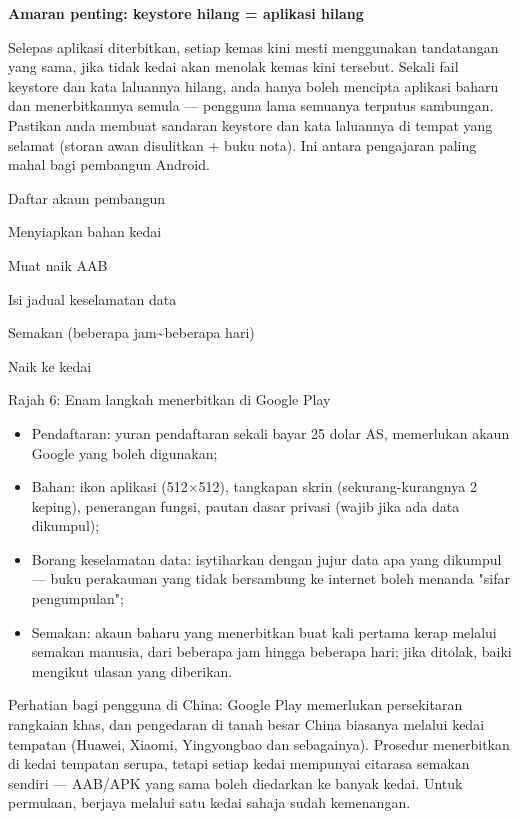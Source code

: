 \textbf{Amaran penting: keystore hilang = aplikasi hilang}\par

Selepas aplikasi diterbitkan, setiap kemas kini mesti menggunakan tandatangan yang sama, jika tidak kedai akan menolak kemas kini tersebut. Sekali fail keystore dan kata laluannya hilang, anda hanya boleh mencipta aplikasi baharu dan menerbitkannya semula — pengguna lama semuanya terputus sambungan. Pastikan anda membuat sandaran keystore dan kata laluannya di tempat yang selamat (storan awan disulitkan + buku nota). Ini antara pengajaran paling mahal bagi pembangun Android.


Daftar akaun pembangun

Menyiapkan bahan kedai

Muat naik AAB

Isi jadual keselamatan data

Semakan (beberapa jam\textasciitilde{}beberapa hari)

Naik ke kedai

\begin{center}\small\color{gray}Rajah 6: Enam langkah menerbitkan di Google Play\end{center}

\begin{itemize}
  \item Pendaftaran: yuran pendaftaran sekali bayar 25 dolar AS, memerlukan akaun Google yang boleh digunakan;
  \item Bahan: ikon aplikasi (512×512), tangkapan skrin (sekurang-kurangnya 2 keping), penerangan fungsi, pautan dasar privasi (wajib jika ada data dikumpul);
  \item Borang keselamatan data: isytiharkan dengan jujur data apa yang dikumpul — buku perakaunan yang tidak bersambung ke internet boleh menanda "sifar pengumpulan";
  \item Semakan: akaun baharu yang menerbitkan buat kali pertama kerap melalui semakan manusia, dari beberapa jam hingga beberapa hari; jika ditolak, baiki mengikut ulasan yang diberikan.
\end{itemize}

Perhatian bagi pengguna di China: Google Play memerlukan persekitaran rangkaian khas, dan pengedaran di tanah besar China biasanya melalui kedai tempatan (Huawei, Xiaomi, Yingyongbao dan sebagainya). Prosedur menerbitkan di kedai tempatan serupa, tetapi setiap kedai mempunyai citarasa semakan sendiri — AAB/APK yang sama boleh diedarkan ke banyak kedai. Untuk permulaan, berjaya melalui satu kedai sahaja sudah kemenangan.

